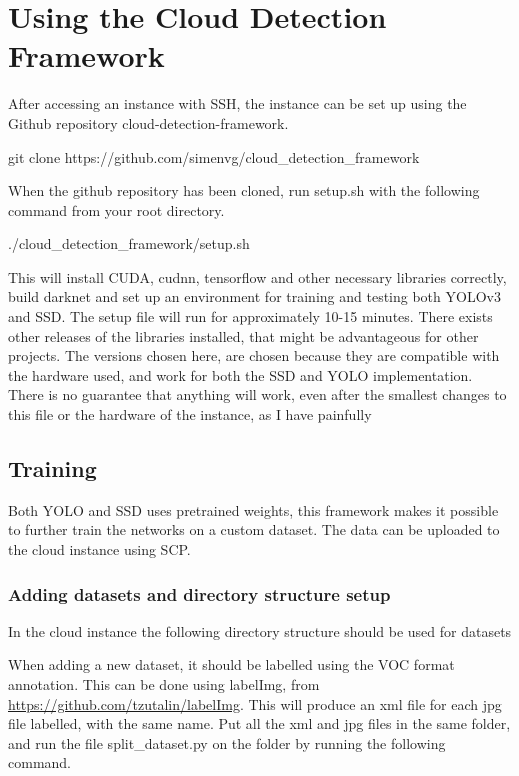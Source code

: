 
\chapter{Using the Cloud Detection Framework}
After accessing an instance with SSH, the instance can be set up using the Github repository cloud-detection-framework. 

\begin{lcverbatim}
git clone https://github.com/simenvg/cloud\_detection\_framework
\end{lcverbatim}

\noindent
When the github repository has been cloned, run setup.sh with the following command from your root directory.

\begin{lcverbatim}
./cloud\_detection\_framework/setup.sh
\end{lcverbatim}

\noindent
This will install CUDA, cudnn, tensorflow and other necessary libraries correctly, build darknet and set up an environment for training and testing both YOLOv3 and SSD. The setup file will run for approximately 10-15 minutes. There exists other releases of the libraries installed, that might be advantageous for other projects. The versions chosen here, are chosen because they are compatible with the hardware used, and work for both the SSD and YOLO implementation. There is no guarantee that anything will work, even after the smallest changes to this file or the hardware of the instance, as I have painfully 

\section{Training}
Both YOLO and SSD uses pretrained weights, this framework makes it possible to further train the networks on a custom dataset. The data can be uploaded to the cloud instance using SCP. 
\newpage
\subsection{Adding datasets and directory structure setup}
In the cloud instance the following directory structure should be used for datasets



When adding a new dataset, it should be labelled using the VOC format annotation. This can be done using labelImg, from \url{https://github.com/tzutalin/labelImg}. This will produce an xml file for each jpg file labelled, with the same name. Put all the xml and jpg files in the same folder, and run the file split\_dataset.py on the folder by running the following command.

